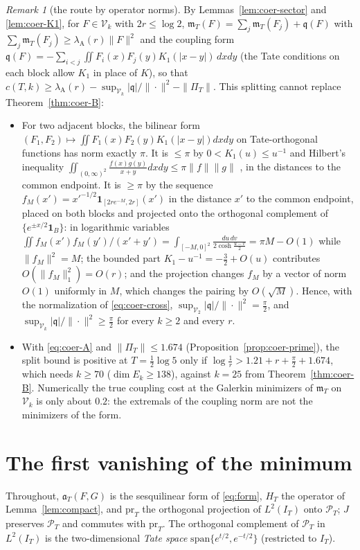 \documentclass[11pt]{amsart}
\theoremstyle{definition}
\theoremstyle{remark}
\newtheorem{remark}[theorem]{Remark}
\newcommand{\PT}{\mathcal P_T}
\newcommand{\IT}{I_T}
\newcommand{\PiT}{\Pi_T}
\newcommand{\mT}{\mathfrak m_T}
\begin{document}
\begin{remark}[the route by operator norms]\label{rem:coer-nogo}
By Lemmas~\ref{lem:coer-sector} and \ref{lem:coer-K1}, for $F\in\mathcal V_k$ with $2r\le\log2$,
$\mT(F)=\sum_j\mT(F_j)+\mathfrak q(F)$ with $\sum_j\mT(F_j)\ge\lambda_{\mathrm A}(r)\|F\|^2$ and the coupling form
$\mathfrak q(F)=-\sum_{i<j}\iint F_i(x)F_j(y)K_1(|x-y|)\,dxdy$ (the Tate conditions on each block allow $K_1$ in place of $K$),
so that $c(T,k)\ge\lambda_{\mathrm A}(r)-\sup_{\mathcal V_k}|\mathfrak q|/\|\cdot\|^2-\|\PiT\|$. This splitting cannot replace
Theorem~\ref{thm:coer-B}:
\begin{itemize}
\item[(a)] For two adjacent blocks, the bilinear form $(F_1,F_2)\mapsto\iint F_1(x)F_2(y)K_1(|x-y|)dxdy$ on Tate-orthogonal
functions has norm exactly $\pi$. It is $\le\pi$ by $0<K_1(u)\le u^{-1}$ and Hilbert's inequality
$\iint_{(0,\infty)^2}\frac{f(x)g(y)}{x+y}dxdy\le\pi\|f\|\|g\|$ \cite[Thm.~316]{HLP}, in the distances to the common endpoint. It is
$\ge\pi$ by the sequence $f_M(x')=x'^{-1/2}\mathbf 1_{[2re^{-M},2r]}(x')$ in the distance $x'$ to the common endpoint, placed on
both blocks and projected onto the orthogonal complement of $\{e^{\pm x/2}\mathbf 1_B\}$: in logarithmic variables
$\iint f_M(x')f_M(y')/(x'+y')=\int_{[-M,0]^2}\frac{du\,dv}{2\cosh\frac{u-v}2}=\pi M-O(1)$ while $\|f_M\|^2=M$; the bounded part
$K_1-u^{-1}=-\frac32+O(u)$ contributes $O(\|f_M\|_1^2)=O(r)$; and the projection changes $f_M$ by a vector of norm $O(1)$
uniformly in $M$, which changes the pairing by $O(\sqrt M)$. Hence, with the normalization of \eqref{eq:coer-cross},
$\sup_{\mathcal V_2}|\mathfrak q|/\|\cdot\|^2=\frac\pi2$, and $\sup_{\mathcal V_k}|\mathfrak q|/\|\cdot\|^2\ge\frac\pi2$ for every $k\ge2$ and every
$r$.
\item[(b)] With \eqref{eq:coer-A} and $\|\PiT\|\le1.674$ (Proposition~\ref{prop:coer-prime}), the split bound is positive at
$T=\frac12\log5$ only if $\log\frac1r>1.21+r+\frac\pi2+1.674$, which needs $k\ge70$ ($\dim E_k\ge138$), against $k=25$ from
Theorem~\ref{thm:coer-B}. Numerically the true coupling cost at the Galerkin minimizers of $\mT$ on $\mathcal V_k$ is only
about $0.2$: the extremals of the coupling norm are not the minimizers of the form.
\end{itemize}
\end{remark}


\section{The first vanishing of the minimum}
Throughout, $\mathfrak a_T(F,G)$ is the sesquilinear form of \eqref{eq:form}, $H_T$ the operator of
Lemma~\ref{lem:compact}, and $\mathrm{pr}_T$ the orthogonal projection of $L^2(\IT)$ onto $\PT$; $J$ preserves
$\PT$ and commutes with $\mathrm{pr}_T$. The orthogonal complement of $\PT$ in $L^2(\IT)$ is the
two-dimensional \emph{Tate space} $\mathrm{span}\{e^{t/2},e^{-t/2}\}$ (restricted to $\IT$).
\end{document}
